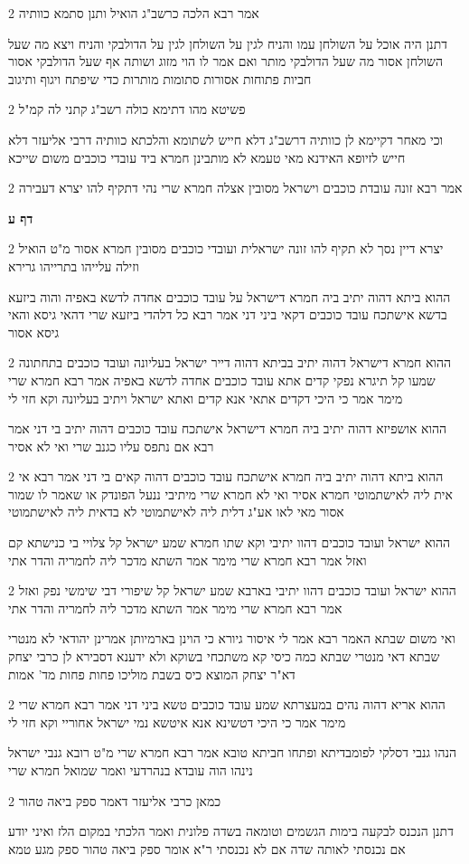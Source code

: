 \documentclass[12pt, openany]{book}
\newcommand{\sethebfont}{
\fontsize{10.5pt}{21.0pt} \selectfont
}
\newcommand{\twocol}[1]{
	{\sethebfont \begin{multicols}{2}
			#1
	\end{multicols}}	
}
\newcommand{\sectname}{}
\newcommand{\newsection}[1]{
	\addcontentsline{toc}{section}{#1}
	\renewcommand{\sectname}{#1}	
	\vspace{-\baselineskip}
	\begin{center}
		\textbf{%
\fontsize{16pt}{16pt}\selectfont
			#1}
	\end{center}
	\vspace{-\baselineskip}
	\nopagebreak
}
\begin{document}
\twocol{אמר רבא הלכה כרשב"ג הואיל ותנן סתמא כוותיה
\par דתנן היה אוכל על השולחן עמו והניח לגין על השולחן לגין על הדולבקי והניח ויצא מה שעל השולחן אסור מה שעל הדולבקי מותר ואם אמר לו הוי מזוג ושותה אף שעל הדולבקי אסור חביות פתוחות אסורות סתומות מותרות כדי שיפתח ויגוף ותיגוב}
\twocol{פשיטא מהו דתימא כולה רשב"ג קתני לה קמ"ל
\par וכי מאחר דקיימא לן כוותיה דרשב"ג דלא חייש לשתומא והלכתא כוותיה דרבי אליעזר דלא חייש לזיופא האידנא מאי טעמא לא מותבינן חמרא ביד עובדי כוכבים משום שייכא}
\twocol{אמר רבא זונה עובדת כוכבים וישראל מסובין אצלה חמרא שרי נהי דתקיף להו יצרא דעבירה}
\newsection{דף ע}
\twocol{יצרא דיין נסך לא תקיף להו זונה ישראלית ועובדי כוכבים מסובין חמרא אסור מ"ט הואיל וזילה עלייהו בתרייהו גרירא
\par ההוא ביתא דהוה יתיב ביה חמרא דישראל על עובד כוכבים אחדה לדשא באפיה והוה ביזעא בדשא אישתכח עובד כוכבים דקאי ביני דני אמר רבא כל דלהדי ביזעא שרי דהאי גיסא והאי גיסא אסור}
\twocol{ההוא חמרא דישראל דהוה יתיב בביתא דהוה דייר ישראל בעליונה ועובד כוכבים בתחתונה שמעו קל תיגרא נפקי קדים אתא עובד כוכבים אחדה לדשא באפיה אמר רבא חמרא שרי מימר אמר כי היכי דקדים אתאי אנא קדים ואתא ישראל ויתיב בעליונה וקא חזי לי
\par ההוא אושפיזא דהוה יתיב ביה חמרא דישראל אישתכח עובד כוכבים דהוה יתיב בי דני אמר רבא אם נתפס עליו כגנב שרי ואי לא אסיר}
\twocol{ההוא ביתא דהוה יתיב ביה חמרא אישתכח עובד כוכבים דהוה קאים בי דני אמר רבא אי אית ליה לאישתמוטי חמרא אסיר ואי לא חמרא שרי מיתיבי ננעל הפונדק או שאמר לו שמור אסור מאי לאו אע"ג דלית ליה לאישתמוטי לא בדאית ליה לאישתמוטי
\par ההוא ישראל ועובד כוכבים דהוו יתיבי וקא שתו חמרא שמע ישראל קל צלויי בי כנישתא קם ואזל אמר רבא חמרא שרי מימר אמר השתא מדכר ליה לחמריה והדר אתי}
\twocol{ההוא ישראל ועובד כוכבים דהוו יתיבי בארבא שמע ישראל קל שיפורי דבי שימשי נפק ואזל אמר רבא חמרא שרי מימר אמר השתא מדכר ליה לחמריה והדר אתי
\par ואי משום שבתא האמר רבא אמר לי איסור גיורא כי הוינן בארמיותן אמרינן יהודאי לא מנטרי שבתא דאי מנטרי שבתא כמה כיסי קא משתכחי בשוקא ולא ידענא דסבירא לן כרבי יצחק דא"ר יצחק המוצא כיס בשבת מוליכו פחות פחות מד' אמות}
\twocol{ההוא אריא דהוה נהים במעצרתא שמע עובד כוכבים טשא ביני דני אמר רבא חמרא שרי מימר אמר כי היכי דטשינא אנא איטשא נמי ישראל אחוריי וקא חזי לי
\par הנהו גנבי דסלקי לפומבדיתא ופתחו חביתא טובא אמר רבא חמרא שרי מ"ט רובא גנבי ישראל נינהו הוה עובדא בנהרדעי ואמר שמואל חמרא שרי}
\twocol{כמאן כרבי אליעזר דאמר ספק ביאה טהור
\par דתנן הנכנס לבקעה בימות הגשמים וטומאה בשדה פלונית ואמר הלכתי במקום הלז ואיני יודע אם נכנסתי לאותה שדה אם לא נכנסתי ר"א אומר ספק ביאה טהור ספק מגע טמא}
\end{document}
